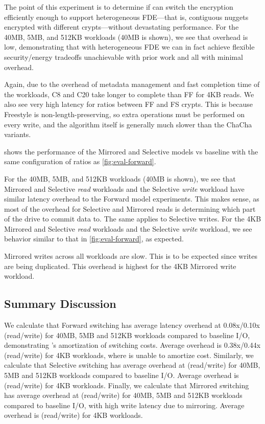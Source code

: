 

The point of this experiment is to determine if \sys can switch the encryption
efficiently enough to support heterogeneous FDE---that is, contiguous nuggets
encrypted with different crypts---without devastating performance. For the 40MB,
5MB, and 512KB workloads (40MB is shown), we see that overhead is low,
demonstrating that with heterogeneous FDE we can in fact achieve flexible
security/energy tradeoffs unachievable with prior work and all with minimal
overhead.

Again, due to the overhead of metadata management and fast completion time of
the workloads, C8 and C20 take longer to complete than FF for 4KB reads. We also
see very high latency for ratios between FF and FS crypts. This is because
Freestyle is non-length-preserving, so extra operations must be performed on
every write, and the algorithm itself is generally much slower than the ChaCha
variants.

 shows the performance of the Mirrored and Selective models vs
baseline with the same configuration of ratios as \cref{fig:eval-forward}.

For the 40MB, 5MB, and 512KB workloads (40MB is shown), we see that Mirrored and
Selective {\em read} workloads and the Selective {\em write} workload have
similar latency overhead to the Forward model experiments. This makes sense, as
most of the overhead for Selective and Mirrored reads is determining which part
of the drive to commit data to. The same applies to Selective writes. For the
4KB Mirrored and Selective {\em read} workloads and the Selective {\em write}
workload, we see behavior similar to that in \cref{fig:eval-forward}, as
expected.

Mirrored writes across all workloads are slow. This is to be expected since
writes are being duplicated. This overhead is highest for the 4KB Mirrored write
workload.


\subsection{Summary Discussion}\label{subsec:eval-overhead}

We calculate that Forward switching has average latency overhead at 0.08x/0.10x
(read/write) for 40MB, 5MB and 512KB workloads compared to baseline I/O,
demonstrating \sys's amortization of switching costs. Average overhead is
0.38x/0.44x (read/write) for 4KB workloads, where \sys is unable to amortize
cost. Similarly, we calculate that Selective switching has average overhead at
 (read/write) for 40MB, 5MB and 512KB workloads compared to baseline
I/O. Average overhead is  (read/write) for 4KB workloads. Finally,
we calculate that Mirrored switching has average overhead at 
(read/write) for 40MB, 5MB and 512KB workloads compared to baseline I/O, with
high write latency due to mirroring. Average overhead is 
(read/write) for 4KB workloads.

